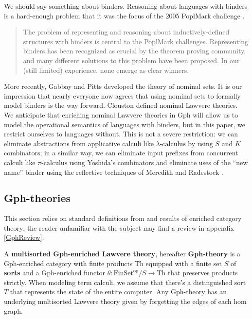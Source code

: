\documentclass[submission,copyright,creativecommons]{eptcs}
\newcommand{\maps}{\colon}
\newcommand{\Th}{\mathrm{Th}}
\newcommand{\FinSet}{\mathrm{FinSet}}
\newcommand{\op}{\mathrm{op}}
\newcommand{\pic}{$\pi\mbox{-calculus}$\xspace}
\newcommand{\lac}{$\lambda\mbox{-calculus}$\xspace}
\begin{document}
We should say something about binders.  Reasoning about languages with binders is a hard-enough problem that it was the focus of the 2005 PoplMark challenge \cite{PoplMark}.
\begin{quote}
  The problem of representing and reasoning about inductively-defined structures with binders is central to the PoplMark challenges. Representing binders has been recognized as crucial by the theorem proving community, and many different solutions to this problem have been proposed. In our (still limited) experience, none emerge as clear winners.
\end{quote}
More recently, Gabbay and Pitts \cite{GabbayPitts} developed the theory of nominal sets.  It is our impression that nearly everyone now agrees that using nominal sets to formally model binders is the way forward.  Clouston \cite{Clouston}
defined nominal Lawvere theories.  We anticipate that enriching nominal Lawvere theories in Gph will allow us to model the operational semantics of languages with binders, but in this paper, we restrict ourselves to languages without.  This is not a severe restriction: we can eliminate abstractions from applicative calculi like \lac by using $S$ and $K$ combinators; in a similar way, we can eliminate input prefixes from concurrent calculi like \pic using Yoshida's combinators \cite{Yoshida} and eliminate uses of the ``new name'' binder using the reflective techniques of Meredith and Radestock \cite{MeredithRadestock}.

\subsection{Gph-theories}

This section relies on standard definitions from and results of enriched category theory; the reader unfamiliar with the subject may find a review in appendix \ref{GphReview}.

A {\bf multisorted Gph-enriched Lawvere theory}, hereafter {\bf Gph-theory} is a Gph-enriched category with finite products Th equipped with a finite set $S$ of {\bf sorts} and a Gph-enriched functor $\theta\maps \FinSet^{\op}/S \to \Th$ that preserves products strictly.  When modeling term calculi, we assume that there's a distinguished sort $T$ that represents the state of the entire computer.  Any Gph-theory has an underlying multisorted Lawvere theory given by forgetting the edges of each hom graph.
\end{document}
